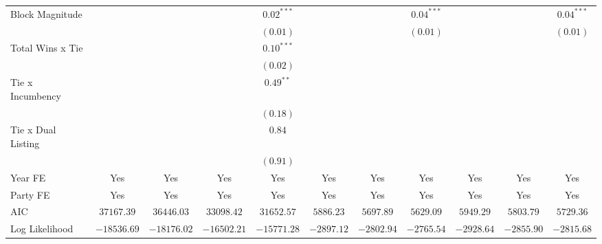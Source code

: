 \begin{table}
\begin{center}
\begin{tabular}{l c c c c c c c c c c}
Block Magnitude    &               &               &               & $0.02^{***}$  &              &              & $0.04^{***}$ &              &              & $0.04^{***}$  \\
                   &               &               &               & $(0.01)$      &              &              & $(0.01)$     &              &              & $(0.01)$      \\
Total Wins x Tie   &               &               &               & $0.10^{***}$  &              &              &              &              &              &               \\
                   &               &               &               & $(0.02)$      &              &              &              &              &              &               \\
Tie x Incumbency   &               &               &               & $0.49^{**}$   &              &              &              &              &              &               \\
                   &               &               &               & $(0.18)$      &              &              &              &              &              &               \\
Tie x Dual Listing &               &               &               & $0.84$        &              &              &              &              &              &               \\
                   &               &               &               & $(0.91)$      &              &              &              &              &              &               \\
\hline
Year FE            & Yes           & Yes           & Yes           & Yes           & Yes          & Yes          & Yes          & Yes          & Yes          & Yes           \\
Party FE           & Yes           & Yes           & Yes           & Yes           & Yes          & Yes          & Yes          & Yes          & Yes          & Yes           \\
AIC                & $37167.39$    & $36446.03$    & $33098.42$    & $31652.57$    & $5886.23$    & $5697.89$    & $5629.09$    & $5949.29$    & $5803.79$    & $5729.36$     \\
Log Likelihood     & $-18536.69$   & $-18176.02$   & $-16502.21$   & $-15771.28$   & $-2897.12$   & $-2802.94$   & $-2765.54$   & $-2928.64$   & $-2855.90$   & $-2815.68$    \\

\end{tabular}
\end{center}
\end{table}
